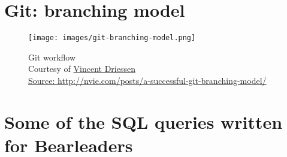 \chapter{Git: branching model}\label{appendix-git}

\begin{figure}[!h]
   \centering\texttt{[image: images/git-branching-model.png]}
   \caption[]{Git workflow\\Courtesy of \href{https://twitter.com/nvie/status/644601079985008640}{Vincent Driessen\\Source: \href{http://nvie.com/posts/a-successful-git-branching-model/}{http://nvie.com/posts/a-successful-git-branching-model/}}} %
\end{figure}

\chapter{Some of the SQL queries written for Bearleaders}\label{bearleaders-sql}

